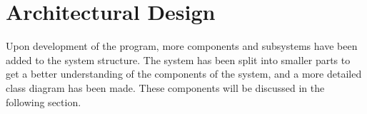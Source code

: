 \chapter{Architectural Design} \label{ch:architectural_design}
Upon development of the program, more components and subsystems have been added to the system structure. The system has been split into smaller parts to get a better understanding of the components of the system, and a more detailed class diagram has been made. These components will be discussed in the following section.
